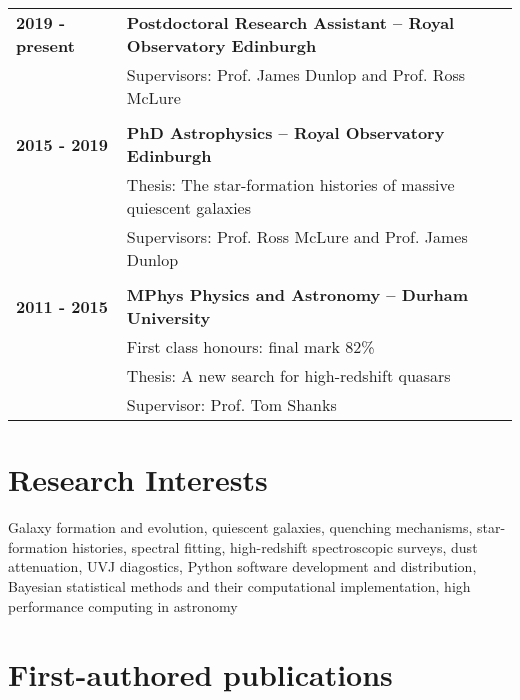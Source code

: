 \documentclass[a4paper,fleqn,usenatbib,onecolumn]{mnras}
\title[Adam Carnall]{\center{Adam Carnall}}
\author[Adam Carnall]{Postdoctoral Research Assistant, Institute for Astronomy, Royal Observatory Edinburgh, EH9 3HJ
\\
}
\begin{document}
\maketitle



\large

\begingroup
\setlength{\tabcolsep}{0pt} %
\renewcommand{\arraystretch}{1.1} %
\begin{tabular}{ p{3cm} p{14cm} }
\\
\bf{2019 - present} & \bf{Postdoctoral Research Assistant -- Royal Observatory Edinburgh}\\
& Supervisors: Prof. James Dunlop and Prof. Ross McLure\\
\\
\bf{2015 - 2019} & \bf{PhD Astrophysics -- Royal Observatory Edinburgh}\\
& Thesis: The star-formation histories of massive quiescent galaxies \\
& Supervisors: Prof. Ross McLure and Prof. James Dunlop\\
\\
\bf{2011 - 2015} & \bf{MPhys Physics and Astronomy -- Durham University} \\          
& First class honours: final mark 82\% \\
& Thesis: A new search for high-redshift quasars\\
& Supervisor: Prof. Tom Shanks\\
\end{tabular}
\endgroup

\section*{Research Interests}

\noindent Galaxy formation and evolution, quiescent galaxies, quenching mechanisms, star-formation histories, spectral fitting, high-redshift spectroscopic surveys, dust attenuation, UVJ diagostics, Python software development and distribution, Bayesian statistical methods and their computational implementation, high performance computing in astronomy


\section*{First-authored publications}

\end{document}
